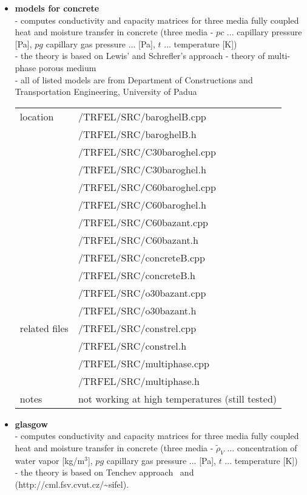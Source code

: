 \begin{itemize}
\item{\bf models for concrete}\\ 
- computes conductivity and capacity matrices for three media fully coupled heat and moisture transfer in concrete 
(three media - $pc$ ... capillary pressure [Pa], $pg$ capillary gas pressure ... [Pa], $t$ ... temperature [K])\\
- the theory is based on Lewis' and Schrefler's approach - theory of multi-phase porous medium\\
- all of listed models are from Department of Constructions and Transportation Engineering, University of Padua~\cite{pesavento}

\begin{center}
\begin{tabular}{|l|l|}
\hline
location & /TRFEL/SRC/baroghelB.cpp\\
         & /TRFEL/SRC/baroghelB.h\\
         & /TRFEL/SRC/C30baroghel.cpp\\
         & /TRFEL/SRC/C30baroghel.h\\
         & /TRFEL/SRC/C60baroghel.cpp\\
         & /TRFEL/SRC/C60baroghel.h\\
         & /TRFEL/SRC/C60bazant.cpp\\
         & /TRFEL/SRC/C60bazant.h\\
         & /TRFEL/SRC/concreteB.cpp\\
         & /TRFEL/SRC/concreteB.h\\
         & /TRFEL/SRC/o30bazant.cpp\\
         & /TRFEL/SRC/o30bazant.h
\\ \hline
related files & /TRFEL/SRC/constrel.cpp\\
              & /TRFEL/SRC/constrel.h\\
              & /TRFEL/SRC/multiphase.cpp\\
              & /TRFEL/SRC/multiphase.h
\\ \hline
notes & not working at high temperatures (still tested) 
\\ \hline
\end{tabular}
\end{center}

\item{\bf glasgow}\\ 
- computes conductivity and capacity matrices for three media fully coupled heat and moisture transfer in concrete 
(three media - $\widetilde{\rho}_V$ ... concentration of water vapor [kg/m$^3$], $pg$ capillary gas pressure ... [Pa], $t$ ... temperature [K])\\
- the theory is based on Tenchev approach~\cite{tenchev} and \cite{glas}(\textsf {http://cml.fsv.cvut.cz/\~{}sifel}).


\end{itemize}
